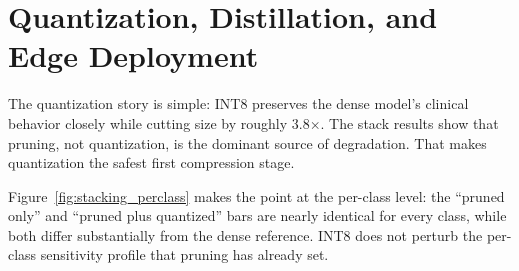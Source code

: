 \documentclass{article}
\begin{document}
\section{Quantization, Distillation, and Edge Deployment}
The quantization story is simple: INT8 preserves the dense model's clinical behavior closely while cutting size by roughly 3.8$\times$. The stack results show that pruning, not quantization, is the dominant source of degradation. That makes quantization the safest first compression stage.

\begin{table}[t]
\centering
\small
\caption{Selected quantization-stacking results from the personal multi-seed runs. Quantization is the safest size reduction, but pruning still controls the clinical tradeoff. Latency is backend-dependent and therefore not the main recommendation signal.}
\label{tab:stacking}
\end{table}

Figure~\ref{fig:stacking_perclass} makes the point at the per-class level: the ``pruned only'' and ``pruned plus quantized'' bars are nearly identical for every class, while both differ substantially from the dense reference. INT8 does not perturb the per-class sensitivity profile that pruning has already set.
\end{document}
